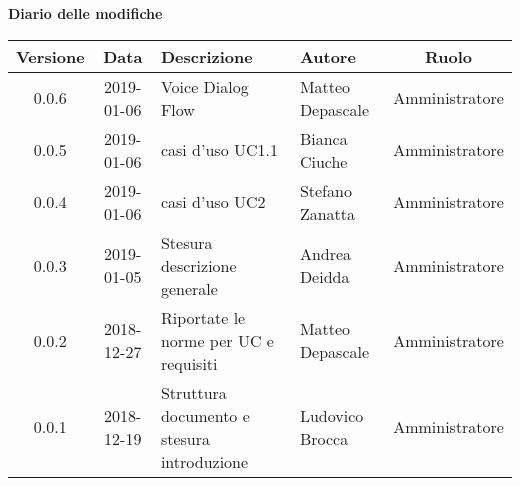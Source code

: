 	\begin{center}
		\textbf{Diario delle modifiche}
	\end{center}
	\begin{center}
		\begin{tabularx}{\textwidth}{|c|c|X|X|c|}
			\hline
			\textbf{Versione} & \textbf{Data} & \textbf{Descrizione} & \textbf{Autore} & \textbf{Ruolo} \\
			\hline
			0.0.6 & 2019-01-06 & Voice Dialog Flow & Matteo Depascale & Amministratore\\
			\hline
			0.0.5 & 2019-01-06 & casi d'uso UC1.1& Bianca Ciuche & Amministratore\\
			\hline
			0.0.4 & 2019-01-06 & casi d'uso UC2& Stefano Zanatta & Amministratore\\
			\hline
			0.0.3 & 2019-01-05 & Stesura descrizione generale& Andrea Deidda & Amministratore\\
			\hline
			0.0.2 & 2018-12-27 & Riportate le norme per UC e requisiti& Matteo Depascale & Amministratore\\
			\hline
			0.0.1 & 2018-12-19 & Struttura documento e stesura introduzione& Ludovico Brocca & Amministratore\\
			\hline
		\end{tabularx}
	\end{center}
\newpage
